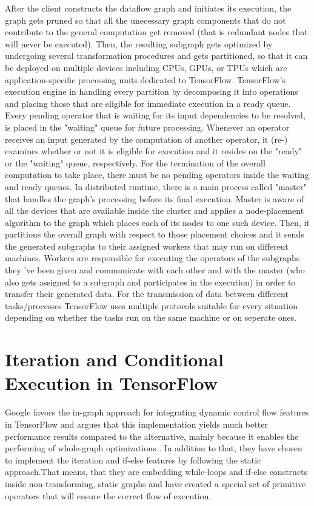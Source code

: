 \documentclass[ack,preface]{dithesis}
\begin{document}
After the client constructs the dataflow graph and initiates its execution, the graph gets pruned so that all the unecessary graph components that do not contribute to the general computation get removed (that is redundant nodes that will never be executed). Then, the resulting subgraph gets optimized by undergoing several transformation procedures and gets partitioned, so that it can be deployed on multiple devices including CPUs, GPUs, or TPUs which are application-specific processing units dedicated to TensorFlow. TensorFlow's execution engine in handling every partition by decomposing it into operations and placing those that are eligible for immediate execution in a ready queue. Every pending operator that is waiting for its input dependencies to be resolved, is placed in the "waiting" queue for future processing. Whenever an operator receives an input generated by the computation of another operator, it (re-) examines whether or not it is eligible for execution and it resides on the "ready" or the "waiting" queue, respectively. For the termination of the overall computation to take place, there must be no pending operators inside the waiting and ready queues.
In distributed runtime, there is a main process called "master" that handles the graph's processing before its final execution. Master is aware of all the devices that are available inside the cluster 
and  applies a node-placement algorithm to the graph which places each of its nodes to one such device. Then, it partitions the overall graph with respect to those placement choices and it sends the generated subgraphs to their assigned workers that may run on different machines. Workers are responsible for executing the operators of the subgraphs they 've been given and communicate with each other and with the master (who also gets assigned to a subgraph and participates in the execution) in order to transfer their generated data. For the transmission of data  between different tasks/processes TensorFlow uses multiple protocols suitable for every situation depending on whether the tasks run on the same machine or on seperate ones.

    \section{Iteration and Conditional Execution in TensorFlow}
Google favors the in-graph approach for integrating dynamic control flow features in TensorFlow and argues that this implementation yields much better performance results compared to the alternative, mainly because it enables the performing of whole-graph optimizations \cite{Yu:2018}. In addition to that, they have chosen to implement the iteration and if-else features by following the static approach.That means, that they are embedding while-loops and if-else constructs inside non-transforming, static graphs and have created a special set of primitive operators that will ensure the correct flow of execution.
\end{document}
